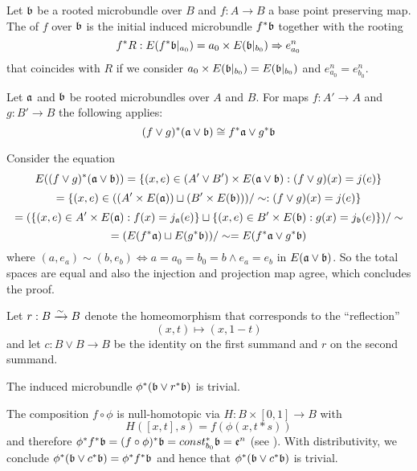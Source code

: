 \begin{mydefinition}
    Let $\mathfrak{b}$ be a rooted microbundle over $B$ and $f: A \to B$ a base point preserving map.
    The  of $f$ over $\mathfrak{b}$ is the initial induced microbundle $f^*\mathfrak{b}$ together with the rooting
    \[ f^*R: E(f^*\mathfrak{b}\vert_{a_0}) = a_0 \times E(\mathfrak{b}\vert_{b_0}) \Rightarrow{} e^n_{a_0} \]
    that coincides with $R$ if we consider $a_0 \times E(\mathfrak{b}\vert_{b_0}) = E(\mathfrak{b}\vert_{b_0})$ and $e^n_{a_0} = e^n_{b_0}$.
\end{mydefinition}

\begin{mylemma}\label{suspension::distributivity}%
    Let $\mathfrak{a}$ and $\mathfrak{b}$ be rooted microbundles over $A$ and $B$.
    For maps $f: A' \to A$ and $g: B' \to B$ the following applies:
    \[ (f \vee g)^*(\mathfrak{a} \vee \mathfrak{b}) \cong f^*\mathfrak{a} \vee g^*\mathfrak{b} \]
\end{mylemma}
\begin{myproof}
    Consider the equation
    \[ E((f \vee g)^*(\mathfrak{a} \vee \mathfrak{b})) = \{(x, e) \in (A' \vee B') \times E(\mathfrak{a} \vee \mathfrak{b}):(f \vee g)(x) = j(e)\} \]
    \[ = \{(x, e) \in ((A' \times E(\mathfrak{a})) \sqcup (B' \times E(\mathfrak{b}))) / \sim:(f \vee g)(x) = j(e)\} \]
    \[ = (\{(x, e) \in A' \times E(\mathfrak{a}):f(x) = j_{\mathfrak{a}}(e)\} \sqcup \{(x, e) \in B' \times E(\mathfrak{b}):g(x) = j_{\mathfrak{b}}(e)\}) / \sim \]
    \[ = (E(f^*\mathfrak{a}) \sqcup E(g^*\mathfrak{b})) / \sim = E(f^*\mathfrak{a} \vee g^*\mathfrak{b})\]
    where $(a, e_a) \sim (b, e_b) \iff a = a_0 = b_0 = b \land e_a = e_b$ in $E(\mathfrak{a} \vee \mathfrak{b})$.
    So the total spaces are equal and also the injection and projection map agree, which concludes the proof.
\end{myproof}

\begin{myparagraph}
    Let $r: B \xrightarrow{\sim} B$ denote the homeomorphism that corresponds to the ``reflection''
    \[ (x, t) \mapsto (x, 1 - t)\]
    and let $c: B \vee B \to B$ be the identity on the first summand and $r$ on the second summand.
\end{myparagraph}
\begin{mylemma}\label{suspension::reflection}
    The induced microbundle $\phi^*(\mathfrak{b} \vee r^*\mathfrak{b})$ is trivial.
\end{mylemma}
\begin{myproof}
    The composition $f \circ \phi$ is null-homotopic via $H: B \times [0, 1] \to B$ with
    \[ H([x, t], s) = f(\phi(x, t * s)) \]
    and therefore $\phi^*f^*\mathfrak{b} = (f \circ \phi)^*\mathfrak{b} = const_{b_0}^*\mathfrak{b} = \mathfrak{e}^n$ (see ).
    With distributivity, we conclude $\phi^*(\mathfrak{b} \vee c^*\mathfrak{b}) = \phi^*f^*\mathfrak{b}$ and hence that $\phi^*(\mathfrak{b} \vee c^*\mathfrak{b})$ is trivial.
\end{myproof}

